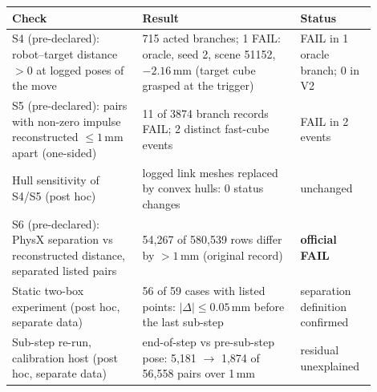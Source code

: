 \begin{tabular}{p{0.33\linewidth}p{0.40\linewidth}p{0.17\linewidth}}
\toprule
Check & Result & Status\\
\midrule
S4 (pre-declared): robot--target distance $>0$ at logged poses of the move & 715 acted branches; 1 FAIL: oracle, seed 2, scene 51152, $-2.16$\,mm (target cube grasped at the trigger) & FAIL in 1 oracle branch; 0 in V2\\
S5 (pre-declared): pairs with non-zero impulse reconstructed $\le 1$\,mm apart (one-sided) & 11 of 3874 branch records FAIL; 2 distinct fast-cube events & FAIL in 2 events\\
Hull sensitivity of S4/S5 (post hoc) & logged link meshes replaced by convex hulls: 0 status changes & unchanged\\
S6 (pre-declared): PhysX separation vs reconstructed distance, separated listed pairs & 54,267 of 580,539 rows differ by $>1$\,mm (original record) & \textbf{official FAIL}\\
Static two-box experiment (post hoc, separate data) & 56 of 59 cases with listed points: $|\Delta| \le 0.05$\,mm before the last sub-step & separation definition confirmed\\
Sub-step re-run, calibration host (post hoc, separate data) & end-of-step vs pre-sub-step pose: 5,181 $\to$ 1,874 of 56,558 pairs over 1\,mm & residual unexplained\\
\bottomrule
\end{tabular}
